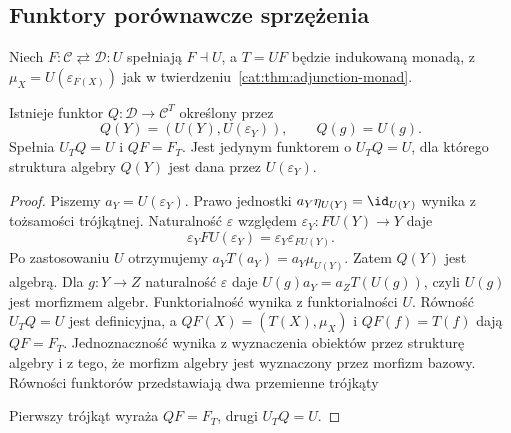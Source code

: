 \subsection{Funktory porównawcze sprzężenia}
Niech $F:\mathcal C\rightleftarrows\mathcal D:U$ spełniają $F\dashv U$, a $T=UF$ będzie indukowaną monadą, z $\mu_X=U(\varepsilon_{F(X)})$ jak w twierdzeniu~\ref{cat:thm:adjunction-monad}.

\begin{twierdzenie}\label{cat:thm:em-comparison}
Istnieje funktor $Q:\mathcal D\to\mathcal C^T$ określony przez
\[
 Q(Y)=(U(Y),U(\varepsilon_Y)),\qquad Q(g)=U(g).
\]
Spełnia $U_T Q=U$ i $QF=F_T$. Jest jedynym funktorem o $U_T Q=U$, dla którego struktura algebry $Q(Y)$ jest dana przez $U(\varepsilon_Y)$.
\end{twierdzenie}
\begin{proof}
Piszemy $a_Y=U(\varepsilon_Y)$. Prawo jednostki $a_Y\eta_{U(Y)}=\id_{U(Y)}$ wynika z tożsamości trójkątnej. Naturalność $\varepsilon$ względem $\varepsilon_Y:FU(Y)\to Y$ daje
\[
 \varepsilon_Y FU(\varepsilon_Y)=\varepsilon_Y\varepsilon_{FU(Y)}.
\]
Po zastosowaniu $U$ otrzymujemy $a_Y T(a_Y)=a_Y\mu_{U(Y)}$. Zatem $Q(Y)$ jest algebrą. Dla $g:Y\to Z$ naturalność $\varepsilon$ daje $U(g)a_Y=a_ZT(U(g))$, czyli $U(g)$ jest morfizmem algebr. Funktorialność wynika z funktorialności $U$. Równość $U_TQ=U$ jest definicyjna, a $QF(X)=(T(X),\mu_X)$ i $QF(f)=T(f)$ dają $QF=F_T$. Jednoznaczność wynika z wyznaczenia obiektów przez strukturę algebry i z tego, że morfizm algebry jest wyznaczony przez morfizm bazowy.
Równości funktorów przedstawiają dwa przemienne trójkąty
\begin{center}
\end{center}
Pierwszy trójkąt wyraża $QF=F_T$, drugi $U_TQ=U$.
\end{proof}

